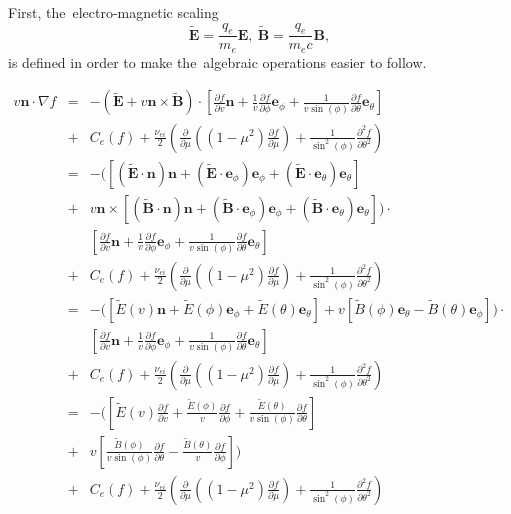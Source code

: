 \documentclass[preprint,12pt]{elsarticle}
\newcommand{\pdv}[2]{\frac{\partial{#1}}{\partial{#2}}}
\newcommand{\vect}[1]{\boldsymbol{#1}}
\newcommand{\vmag}{v}
\newcommand{\vn}{\vect{n}}
\newcommand{\E}{\vect{E}}
\newcommand{\B}{\vect{B}}
\newcommand{\tE}{\vect{\tilde{E}}}
\newcommand{\tB}{\vect{\tilde{B}}}
\newcommand{\qe}{q_e}
\newcommand{\me}{m_e}
\newcounter{bla}
\begin{document}
First, the~electro-magnetic scaling
\begin{equation}
  \tE = \frac{\qe}{\me}\E,~\tB = \frac{\qe}{\me c} \B,
\end{equation}
is defined in order to make the~algebraic operations easier to follow.

\begin{eqnarray}
  \vmag\vn\cdot\nabla f 
  &=& - \left(\tE + \vmag\vn\times\tB\right)\cdot
  \left[ \pdv{f}{\vmag}\vn 
  + \frac{1}{\vmag}\pdv{f}{\phi}\vect{e}_\phi
  + \frac{1}{\vmag\sin(\phi)}\pdv{f}{\theta}\vect{e}_{\theta} \right] 
  \nonumber \\
  &+& C_e(f) 
  + \frac{\nu_{ei}}{2} 
  \left(\pdv{}{\mu}\left((1 - \mu^2)\pdv{f}{\mu}\right)
  + \frac{1}{\sin^2(\phi)}\frac{\partial^2f}{\partial\theta^2} \right) 
  \nonumber \\
  &=& - \Big(
  \left[\left(\tE\cdot\vn\right)\vn 
  + \left(\tE\cdot\vect{e}_\phi\right)\vect{e}_\phi
  + \left(\tE\cdot\vect{e}_\theta\right)\vect{e}_\theta \right] 
  \nonumber \\
  &+& \vmag\vn\times
  \left[\left(\tB\cdot\vn\right)\vn 
  + \left(\tB\cdot\vect{e}_\phi\right)\vect{e}_\phi
  + \left(\tB\cdot\vect{e}_\theta\right)\vect{e}_\theta \right] \Big)\cdot 
  \nonumber \\
  && \left[ \pdv{f}{\vmag}\vn 
  + \frac{1}{\vmag}\pdv{f}{\phi}\vect{e}_\phi
  + \frac{1}{\vmag\sin(\phi)}\pdv{f}{\theta}\vect{e}_{\theta} \right] 
  \nonumber \\
  &+& C_e(f)
  + \frac{\nu_{ei}}{2} 
  \left(\pdv{}{\mu}\left((1 - \mu^2)\pdv{f}{\mu}\right)
  + \frac{1}{\sin^2(\phi)}\frac{\partial^2f}{\partial\theta^2} \right) 
  \nonumber \\ 
  &=& - \Big(
  \left[\tilde{E}(\vmag)\vn 
  + \tilde{E}(\phi)\vect{e}_\phi
  + \tilde{E}(\theta)\vect{e}_\theta \right] 
  + \vmag
  \left[\tilde{B}(\phi)\vect{e}_\theta 
  - \tilde{B}(\theta)\vect{e}_\phi \right] \Big)\cdot 
  \nonumber \\
  && \left[ \pdv{f}{\vmag}\vn 
  + \frac{1}{\vmag}\pdv{f}{\phi}\vect{e}_\phi
  + \frac{1}{\vmag\sin(\phi)}\pdv{f}{\theta}\vect{e}_{\theta} \right] 
  \nonumber \\
  &+& C_e(f)
  + \frac{\nu_{ei}}{2} 
  \left(\pdv{}{\mu}\left((1 - \mu^2)\pdv{f}{\mu}\right)
  + \frac{1}{\sin^2(\phi)}\frac{\partial^2f}{\partial\theta^2} \right)
  \nonumber \\
  &=& - \Bigg(
  \left[ \tilde{E}(\vmag)\pdv{f}{\vmag} 
  + \frac{\tilde{E}(\phi)}{\vmag}\pdv{f}{\phi}
  + \frac{\tilde{E}(\theta)}{\vmag\sin(\phi)}\pdv{f}{\theta} \right]
  \nonumber \\ 
  &+& \vmag
  \left[\frac{\tilde{B}(\phi)}{\vmag\sin(\phi)}\pdv{f}{\theta}
  - \frac{\tilde{B}(\theta)}{\vmag}\pdv{f}{\phi} \right] \Bigg)
  \nonumber \\
  &+& C_e(f) 
  + \frac{\nu_{ei}}{2} 
  \left(\pdv{}{\mu}\left((1 - \mu^2)\pdv{f}{\mu}\right)
  + \frac{1}{\sin^2(\phi)}\frac{\partial^2f}{\partial\theta^2} \right)
  \label{eq:BGK_spherical_definition}
\end{eqnarray}
\end{document}
